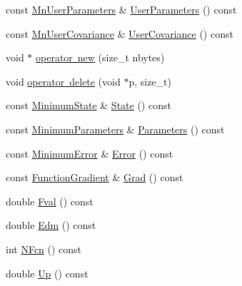 \begin{DoxyCompactItemize}
\item 
const \mbox{\hyperlink{classROOT_1_1Minuit2_1_1MnUserParameters}{Mn\+User\+Parameters}} \& \mbox{\hyperlink{classROOT_1_1Minuit2_1_1BasicFunctionMinimum_aa6fa4f1678939015849b6a2ab6023238}{User\+Parameters}} () const
\item 
const \mbox{\hyperlink{classROOT_1_1Minuit2_1_1MnUserCovariance}{Mn\+User\+Covariance}} \& \mbox{\hyperlink{classROOT_1_1Minuit2_1_1BasicFunctionMinimum_a4f06adfe70411becfe7aa48f6bce1f22}{User\+Covariance}} () const
\item 
void $\ast$ \mbox{\hyperlink{classROOT_1_1Minuit2_1_1BasicFunctionMinimum_a49a32bdb3ff21202fcfa9a9e42015b8f}{operator new}} (size\+\_\+t nbytes)
\item 
void \mbox{\hyperlink{classROOT_1_1Minuit2_1_1BasicFunctionMinimum_ab9d53fd0c21ac6456afdb233e4cbaf1b}{operator delete}} (void $\ast$p, size\+\_\+t)
\item 
const \mbox{\hyperlink{classROOT_1_1Minuit2_1_1MinimumState}{Minimum\+State}} \& \mbox{\hyperlink{classROOT_1_1Minuit2_1_1BasicFunctionMinimum_a57c7f1a6d3551fd329698e0fc9424fec}{State}} () const
\item 
const \mbox{\hyperlink{classROOT_1_1Minuit2_1_1MinimumParameters}{Minimum\+Parameters}} \& \mbox{\hyperlink{classROOT_1_1Minuit2_1_1BasicFunctionMinimum_acbbd51950f390d29541728f114b2d12e}{Parameters}} () const
\item 
const \mbox{\hyperlink{classROOT_1_1Minuit2_1_1MinimumError}{Minimum\+Error}} \& \mbox{\hyperlink{classROOT_1_1Minuit2_1_1BasicFunctionMinimum_a239c3ed3af4e3bc89b25014ec808e229}{Error}} () const
\item 
const \mbox{\hyperlink{classROOT_1_1Minuit2_1_1FunctionGradient}{Function\+Gradient}} \& \mbox{\hyperlink{classROOT_1_1Minuit2_1_1BasicFunctionMinimum_aa071637493e0d415db455c2eec0990c6}{Grad}} () const
\item 
double \mbox{\hyperlink{classROOT_1_1Minuit2_1_1BasicFunctionMinimum_a4ae5abf5eb1cfa1924abad45529e1ffd}{Fval}} () const
\item 
double \mbox{\hyperlink{classROOT_1_1Minuit2_1_1BasicFunctionMinimum_abecb5c249e988f6f3f792e2bcc11d4a4}{Edm}} () const
\item 
int \mbox{\hyperlink{classROOT_1_1Minuit2_1_1BasicFunctionMinimum_a1b73ebb29cc319f09fdd5a4408e703ba}{N\+Fcn}} () const
\item 
double \mbox{\hyperlink{classROOT_1_1Minuit2_1_1BasicFunctionMinimum_a576364a872f31ede72df956b103e0d6e}{Up}} () const
\item 

\end{DoxyCompactItemize}
